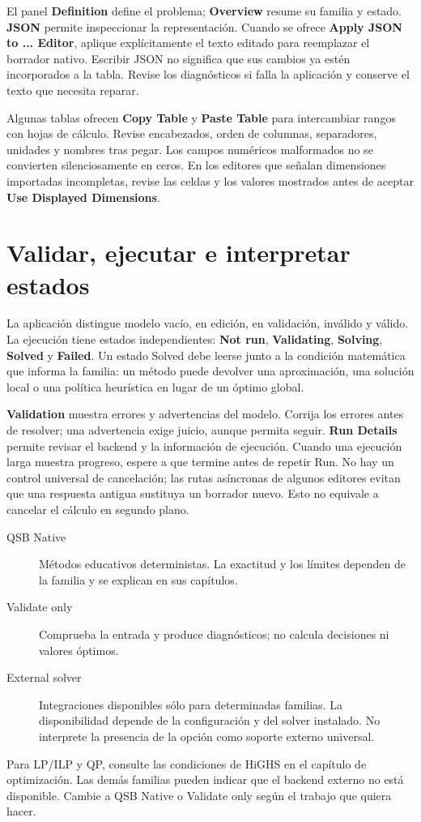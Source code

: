 El panel \textbf{Definition} define el problema; \textbf{Overview} resume su
familia y estado. \textbf{JSON} permite inspeccionar la representación. Cuando
se ofrece \textbf{Apply JSON to ... Editor}, aplique explícitamente el texto
editado para reemplazar el borrador nativo. Escribir JSON no significa que sus
cambios ya estén incorporados a la tabla. Revise los diagnósticos si falla la
aplicación y conserve el texto que necesita reparar.

Algunas tablas ofrecen \textbf{Copy Table} y \textbf{Paste Table} para intercambiar
rangos con hojas de cálculo. Revise encabezados, orden de columnas, separadores,
unidades y nombres tras pegar. Los campos numéricos malformados no se convierten
silenciosamente en ceros. En los editores que señalan dimensiones importadas
incompletas, revise las celdas y los valores mostrados antes de aceptar
\textbf{Use Displayed Dimensions}.

\section{Validar, ejecutar e interpretar estados}
La aplicación distingue modelo vacío, en edición, en validación, inválido y
válido. La ejecución tiene estados independientes: \textbf{Not run},
\textbf{Validating}, \textbf{Solving}, \textbf{Solved} y \textbf{Failed}.
Un estado Solved debe leerse junto a la condición matemática que informa la
familia: un método puede devolver una aproximación, una solución local o una
política heurística en lugar de un óptimo global.

\textbf{Validation} muestra errores y advertencias del modelo. Corrija los
 errores antes de resolver; una advertencia exige juicio, aunque permita seguir.
\textbf{Run Details} permite revisar el backend y la información de ejecución.
Cuando una ejecución larga muestra progreso, espere a que termine antes de
repetir Run. No hay un control universal de cancelación; las rutas asíncronas
de algunos editores evitan que una respuesta antigua sustituya un borrador
nuevo. Esto no equivale a cancelar el cálculo en segundo plano.

\begin{description}
 \item[QSB Native] Métodos educativos deterministas. La exactitud y los límites
 dependen de la familia y se explican en sus capítulos.
 \item[Validate only] Comprueba la entrada y produce diagnósticos; no calcula
 decisiones ni valores óptimos.
 \item[External solver] Integraciones disponibles sólo para determinadas familias.
 La disponibilidad depende de la configuración y del solver instalado.
 No interprete la presencia de la opción como soporte externo universal.
\end{description}
Para LP/ILP y QP, consulte las condiciones de HiGHS en el capítulo de
optimización. Las demás familias pueden indicar que el backend externo no está
disponible. Cambie a QSB Native o Validate only según el trabajo que quiera hacer.

